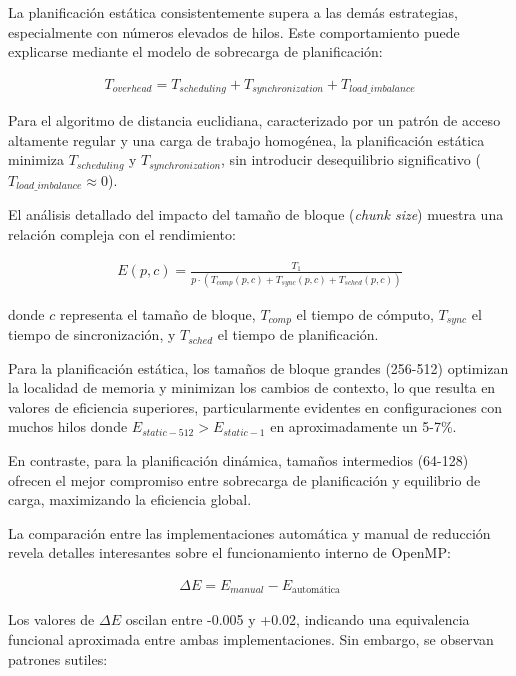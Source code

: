         La planificación estática consistentemente supera a las demás estrategias, especialmente con números elevados de hilos. Este comportamiento puede explicarse mediante el modelo de sobrecarga de planificación:

        \begin{align}
            T_{overhead} = T_{scheduling} + T_{synchronization} + T_{load\_imbalance}
        \end{align}

        Para el algoritmo de distancia euclidiana, caracterizado por un patrón de acceso altamente regular y una carga de trabajo homogénea, la planificación estática minimiza $T_{scheduling}$ y $T_{synchronization}$, sin introducir desequilibrio significativo ($T_{load\_imbalance} \approx 0$).
        
        El análisis detallado del impacto del tamaño de bloque (\textit{chunk size}) muestra una relación compleja con el rendimiento:
        
        \begin{align}
            E(p, c) = \frac{T_1}{p \cdot (T_{comp}(p, c) + T_{sync}(p, c) + T_{sched}(p, c))}
        \end{align}
        
        donde $c$ representa el tamaño de bloque, $T_{comp}$ el tiempo de cómputo, $T_{sync}$ el tiempo de sincronización, y $T_{sched}$ el tiempo de planificación.

        Para la planificación estática, los tamaños de bloque grandes (256-512) optimizan la localidad de memoria y minimizan los cambios de contexto, lo que resulta en valores de eficiencia superiores, particularmente evidentes en configuraciones con muchos hilos donde $E_{static-512} > E_{static-1}$ en aproximadamente un 5-7\%.
        
        En contraste, para la planificación dinámica, tamaños intermedios (64-128) ofrecen el mejor compromiso entre sobrecarga de planificación y equilibrio de carga, maximizando la eficiencia global.
        
        La comparación entre las implementaciones automática y manual de reducción revela detalles interesantes sobre el funcionamiento interno de OpenMP:
        
        \begin{align}
            \Delta E = E_{manual} - E_{\text{automática}}
        \end{align}

        Los valores de $\Delta E$ oscilan entre -0.005 y +0.02, indicando una equivalencia funcional aproximada entre ambas implementaciones. Sin embargo, se observan patrones sutiles:
        
